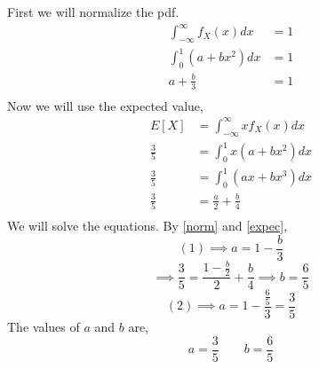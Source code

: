 \documentclass[answers]{exam}
\begin{document}
\begin{questions}
    \begin{framed}
        First we will normalize the pdf.
        \begin{equation}\label{norm}
            \begin{split}
                \int_{-\infty}^{\infty}f_{X}(x)dx & = 1\\
                \int_{0}^{1}(a+bx^2)dx & = 1\\
                a+\frac{b}{3} & = 1\\
            \end{split}
        \end{equation}
        Now we will use the expected value,
        \begin{equation}\label{expec}
            \begin{split}
                E[X] & = \int_{-\infty}^{\infty}xf_{X}(x)dx\\
                \frac{3}{5} & = \int_{0}^{1}x(a+bx^2)dx\\
                \frac{3}{5} & = \int_{0}^{1}(ax+bx^3)dx\\
                \frac{3}{5} & = \frac{a}{2}+\frac{b}{4}\\
            \end{split}
        \end{equation}
        We will solve the equations. By \ref{norm} and \ref{expec},
        \[(1)\implies a=1-\frac{b}{3}\]
        \[\implies \frac{3}{5}=\frac{1-\frac{b}{2}}{2}+\frac{b}{4}\implies b=\frac{6}{5}\]
        \[(2)\implies a=1-\frac{\frac{6}{5}}{3}=\frac{3}{5}\]
        The values of $a$ and $b$ are,
        \[a=\frac{3}{5}\qquad b=\frac{6}{5}\]
    \end{framed}




\end{questions}
\end{document}
